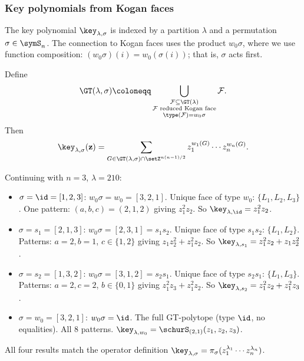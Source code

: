 \subsubsection[keyKogan]{Key polynomials from Kogan faces}

The key polynomial $\key_{\lambda,\sigma}$ is indexed by a partition $\lambda$
and a permutation $\sigma \in \symS_n$.
The connection to Kogan faces uses the product $w_0 \sigma$,
where we use function composition:
$(w_0 \sigma)(i) = w_0(\sigma(i))$; that is, $\sigma$ acts first.

\begin{theorem}
\label{thm:keyGT}\label{keyGelfandTsetlinFormula}
Define
\[
  \GT(\lambda, \sigma) \coloneqq
  \bigcup_{\substack{\mathcal{F} \subseteq \GT(\lambda) \\
    \mathcal{F} \text{ reduced Kogan face} \\
    \type(\mathcal{F}) = w_0 \sigma}} \mathcal{F}.
\]
Then
\[
  \key_{\lambda,\sigma}(\mathbf{z}) =
  \sum_{G \in \GT(\lambda,\sigma) \cap \setZ^{n(n-1)/2}}
  z_1^{w_1(G)} \dotsm z_n^{w_n(G)}.
\]
\end{theorem}


\begin{example*}
Continuing with $n = 3$, $\lambda = 210$:
\begin{itemize}
\item $\sigma = \id = [1,2,3]$:
  $w_0 \sigma = w_0 = [3,2,1]$.
  Unique face of type $w_0$: $\{L_1, L_2, L_3\}$.
  One pattern: $(a,b,c) = (2,1,2)$ giving $z_1^2 z_2$.
  So $\key_{\lambda, \id} = z_1^2 z_2$.

\item $\sigma = s_1 = [2,1,3]$:
  $w_0 \sigma = [2,3,1] = s_1 s_2$.
  Unique face of type $s_1 s_2$: $\{L_1, L_2\}$.
  Patterns: $a=2, b=1$, $c \in \{1,2\}$
  giving $z_1 z_2^2 + z_1^2 z_2$.
  So $\key_{\lambda, s_1} = z_1^2 z_2 + z_1 z_2^2$.

\item $\sigma = s_2 = [1,3,2]$:
  $w_0 \sigma = [3,1,2] = s_2 s_1$.
  Unique face of type $s_2 s_1$: $\{L_1, L_3\}$.
  Patterns: $a=2, c=2$, $b \in \{0,1\}$
  giving $z_1^2 z_3 + z_1^2 z_2$.
  So $\key_{\lambda, s_2} = z_1^2 z_2 + z_1^2 z_3$.

\item $\sigma = w_0 = [3,2,1]$:
  $w_0 \sigma = \id$.
  The full GT-polytope (type $\id$, no equalities).
  All 8 patterns.
  $\key_{\lambda, w_0} = \schurS_{(2,1)}(z_1, z_2, z_3)$.
\end{itemize}
All four results match the operator definition
$\key_{\lambda,\sigma} = \pi_\sigma(z_1^{\lambda_1} \dotsm z_n^{\lambda_n})$.
\end{example*}

